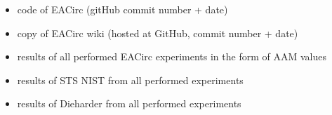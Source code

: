\documentclass[12pt,oneside]{fithesis2}
\newcommand{\squarebullet}{\textcolor{black}{\raisebox{0.15em}{\rule{4pt}{4pt}}}}
\newenvironment{myItemize}{
  \begin{itemize}[leftmargin=2em,rightmargin=1em,itemsep=\parskip ,parsep=0em,topsep=0em,partopsep=0em]
  \renewcommand{\labelitemi}{\squarebullet}
  \renewcommand{\labelitemii}{$\diamond$}
}{
  \end{itemize}
}
\begin{document}
\begin{myItemize}
\item code of EACirc (gitHub commit number + date)
\item copy of EACirc wiki (hosted at GitHub, commit number + date)
\item results of all performed EACirc experiments in the form of AAM values
\item results of STS NIST from all performed experiments
\item results of Dieharder from all performed experiments
\end{myItemize}

\nocite{*}
\printbibliography
\end{document}
